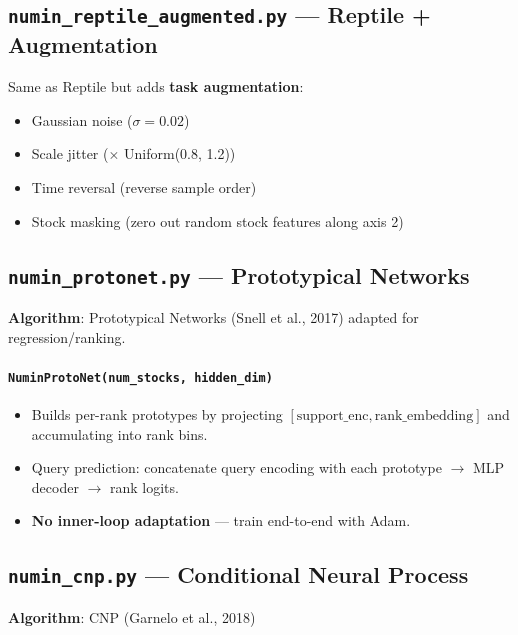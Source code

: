 \documentclass[11pt,a4paper]{article}
\begin{document}
\subsection{\texttt{numin\_reptile\_augmented.py} --- Reptile + Augmentation}
Same as Reptile but adds \textbf{task augmentation}:
\begin{itemize}[nosep]
  \item Gaussian noise ($\sigma=0.02$)
  \item Scale jitter ($\times$ Uniform(0.8, 1.2))
  \item Time reversal (reverse sample order)
  \item Stock masking (zero out random stock features along axis 2)
\end{itemize}

\subsection{\texttt{numin\_protonet.py} --- Prototypical Networks}
\textbf{Algorithm}: Prototypical Networks (Snell et al., 2017) adapted for regression/ranking.

\paragraph{\texttt{NuminProtoNet(num\_stocks, hidden\_dim)}}
\begin{itemize}[nosep]
  \item Builds per-rank prototypes by projecting $[\text{support\_enc}, \text{rank\_embedding}]$ and accumulating into rank bins.
  \item Query prediction: concatenate query encoding with each prototype $\to$ MLP decoder $\to$ rank logits.
  \item \textbf{No inner-loop adaptation} --- train end-to-end with Adam.
\end{itemize}

\subsection{\texttt{numin\_cnp.py} --- Conditional Neural Process}
\textbf{Algorithm}: CNP (Garnelo et al., 2018)
\end{document}
